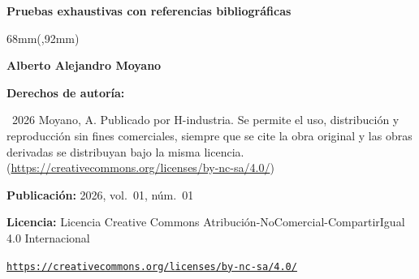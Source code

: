 
\renewcommand{\articuloidiomaxml}{es}
\renewcommand{\articulotitulo}{Pruebas exhaustivas con referencias bibliográficas}
\renewcommand{\articuloautores}{Alberto Alejandro Moyano}
\renewcommand{\articulotipo}{OTHER}
\renewcommand{\articulorevista}{H-industria}
\renewcommand{\articuloissne}{1851-703X}
\renewcommand{\articulovolumen}{01}
\renewcommand{\articulonumero}{01}
\renewcommand{\articulofecha}{NOVIEMBRE 2026}

\setcounter{page}{1}
\thispagestyle{firstpage}

\noindent\begin{minipage}[t]{\dimexpr\textwidth+\marginparsep+\marginparwidth\relax}%
{\sffamily\bfseries\Large\articulotitulo\par}%
\end{minipage}\par
\vspace{3mm}%

\begin{textblock*}{68mm}(\gbbloquex,92mm)
{\setlength{\leftskip}{0pt}\setlength{\parindent}{0pt}%
\noindent\begin{minipage}[t]{68mm}
\sffamily\small\setlength{\parskip}{1pt}
{\bfseries\color{azulrevista}Alberto Alejandro Moyano}\par
\vspace{6pt}
{\bfseries\color{azulrevista!70}Derechos de autor\'ia:}\par
\textcopyright\ 2026 Moyano, A. Publicado por H-industria. Se permite el uso, distribución y reproducción sin fines comerciales, siempre que se cite la obra original y las obras derivadas se distribuyan bajo la misma licencia. (\href{https://creativecommons.org/licenses/by-nc-sa/4.0/}{https://creativecommons.org/licenses/by-nc-sa/4.0/})\par\vspace{6pt}
{\bfseries\color{azulrevista!70}Publicación:} 2026, vol.~01, n\'um.~01\par\vspace{6pt}
{\bfseries\color{azulrevista!70}Licencia:} Licencia Creative Commons Atribución-NoComercial-CompartirIgual 4.0 Internacional\par
{\scriptsize\texttt{\href{https://creativecommons.org/licenses/by-nc-sa/4.0/}{https://creativecommons.org/licenses/by-nc-sa/4.0/}}}\par
\vspace{6pt}
\end{minipage}%
}%
\end{textblock*}


